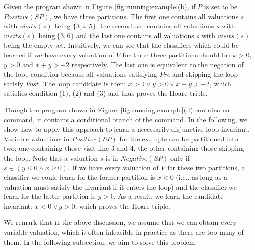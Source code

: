 \begin{example}
Given the program shown in Figure~\ref{fig:running:example}(b), if $P$ is set to be $Positive(SP)$, we have three partitions. The first one contains all valuations $s$ with $visits(s)$ being $\{3,4,5\}$; the second one contains all valuations $s$ with $visits(s)$ being $\{3,6\}$ and the last one contains all valuations $s$ with $visits(s)$ being the empty set. Intuitively, we can see that the classifiers which could be learned if we have every valuation of $V$ for these three partitions should be: $x > 0$, $y>0$ and $x+y > -2$ respectively. The last one is equivalent to the negation of the loop condition because all valuations satisfying $Pre$ and skipping the loop satisfy $Post$. The loop candidate is then: $x > 0 \lor y > 0 \lor x+y>-2$, which satisfies condition (1), (2) and (3) and thus proves the Hoare triple.

Though the program shown in Figure~\ref{fig:running:example}(d) contains no  command,
it contains a conditional branch of the  command. %
In the following, we show how to apply this approach to learn a necessarily disjunctive loop invariant.
 Variable valuations in $Positive(SP)$ for the example can be partitioned into two: one containing those visit line 3 and 4, the other containing those skipping the loop. Note that a valuation $s$ is in $Negative(SP)$ only if $s \in (y\leq 0 \land x \geq 0)$. If we have every valuation of $V$ for these two partitions, a classifier we could learn for the former partition is $x < 0$ (i.e., as long as a valuation must satisfy the invariant if it enters the loop) and the classifier we learn for the latter partition is $y > 0$. As a result, we learn the candidate invariant: $x < 0 \lor y > 0$, which proves the Hoare triple.

We remark that in the above discussion, we assume that we can obtain every variable valuation, which is often infeasible in practice as there are too many of them. In the following subsection, we aim to solve this problem.
\end{example}

